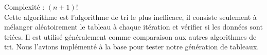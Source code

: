 \label{BogoSort}
\footnotesize 
\noindent
Complexité :  $ (n+1)!$
\\
\normalsize
Cette algorithme est l'algorithme de tri le plus inefficace, il consiste seulement à mélanger aléatoirement le tableau à chaque itération et vérifier si les données sont triées. Il est utilisé généralement comme comparaison aux autres algorithmes de tri. Nous l'avions implémenté à la base pour tester notre génération de tableaux.